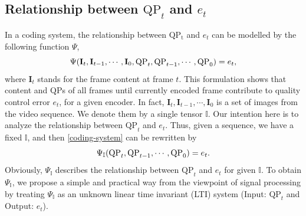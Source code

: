 \documentclass[smallabstract,smallcaptions]{dccpaper}
\begin{document}
\subsection{Relationship between $\mathrm{QP}_{t}$ and $e_t$}\label{relationship-qp-e}
\vspace{-0.5em}
In a coding system, the relationship between $\mathrm{QP_t}$ and $e_t$ can be modelled by the following function $\Psi$,
\begin{equation}
\label{coding-system}
\Psi(\mathbf{I}_{t},\mathbf{I}_{t-1},\cdots,\mathbf{I}_0,\mathrm{QP}_{t},\mathrm{QP}_{t-1},\cdots,\mathrm{QP}_{0})=e_t,
\vspace{-0.5em}
\end{equation}
where $\mathbf{I}_t$ stands for the frame content at frame $t$. This formulation shows that content and $\mathrm{QP}$s of all frames until currently encoded frame contribute to quality control error $e_t$, for a given encoder. In fact, $\mathbf{I}_{t},\mathbf{I}_{t-1},\cdots,\mathbf{I}_0$ is a set of images from the video sequence. We denote them by a single tensor $\mathbb{I}$. Our intention here is to analyze the relationship between $\mathrm{QP}_{t}$ and $e_t$. Thus, given a sequence, we have a fixed $\mathbb{I}$, and then \eqref{coding-system} can be rewritten by
\begin{equation}
\label{coding-system-i-down}
\Psi_\mathbb{I}(\mathrm{QP}_{t},\mathrm{QP}_{t-1},\cdots,\mathrm{QP}_{0})=e_t.
\vspace{-0.5em}
\end{equation}
Obviously, $\Psi_\mathbb{I}$ describes the relationship between $\mathrm{QP}_{t}$ and $e_t$ for given $\mathbb{I}$. To obtain $\Psi_\mathbb{I}$, we propose a simple and practical way from the viewpoint of signal processing by treating $\Psi_\mathbb{I}$ as an unknown linear time invariant (LTI) system (Input: $\mathrm{QP}_{t}$ and Output: $e_t$).
\end{document}
